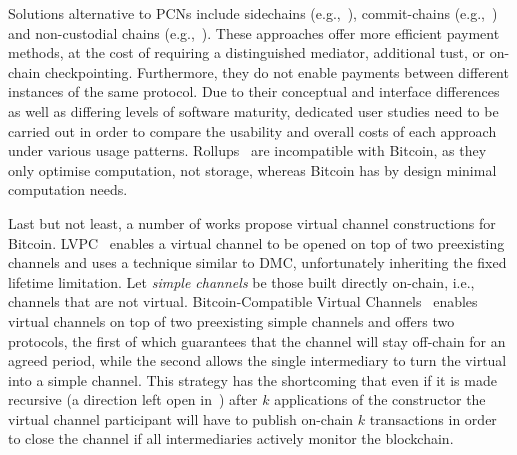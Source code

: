   Solutions alternative to PCNs include side\-chains
  (e.g.,~\cite{BCDF+14,sidechains,KiaZin18}), commit-chains
  (e.g.,~\cite{plasma}) and non-cu\-sto\-di\-al chains
  (e.g.,~\cite{plasma,konstantopoulos2019plasma,plasma-lower-bounds}). These
  approaches offer more efficient payment methods, at the cost of
  requiring a distinguished mediator, additional tust, or on-chain
  checkpointing. Furthermore, they do not enable payments between different instances
  of the same protocol.
  Due to their conceptual and interface differences as
  well as differing levels of software maturity, dedicated user studies need to
  be carried out in order to compare the usability and overall costs of each
  approach under various usage patterns. Rollups~\cite{ZKRollup,Optimism} are
  incompatible with Bitcoin, as they only optimise computation, not storage,
  whereas Bitcoin has by design minimal computation needs.

  Last but not least, a number of works propose virtual channel constructions
  for Bitcoin. LVPC~\cite{10.1007/978-3-030-65411-5_18} enables a virtual channel to be
  opened on top of two preexisting channels and uses a technique similar to DMC,
  unfortunately inheriting the fixed lifetime limitation.
  Let \emph{simple channels} be those built directly on-chain, i.e., channels that are not
  virtual.
  Bitcoin-Compatible Virtual Channels~\cite{9519487} enables
  virtual channels on top of two preexisting simple channels
  and offers two protocols, the first of which guarantees that the channel will
  stay off-chain for an agreed period, while the second allows the single intermediary
  to turn the virtual into a simple channel.
  This strategy has the shortcoming that even if it is made
  recursive (a direction left open in~\cite{9519487}) after $k$
  applications of the constructor the virtual channel participant will have to
  publish on-chain $k$ transactions in order to close the channel if all
  intermediaries actively monitor the blockchain.

